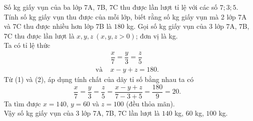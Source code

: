 	\begin{ex}%
		Số kg giấy vụn của ba lớp 7A, 7B, 7C thu được lần lượt tỉ lệ với các số $7; 3; 5$. Tính số kg giấy vụn thu được của mỗi lớp, biết rằng số kg giấy vụn mà 2 lớp 7A và 7C thu được nhiều hơn lớp 7B là $180$ kg.
		\loigiai
		{
			Gọi số kg giấy vụn của 3 lớp 7A, 7B, 7C thu được lần lượt là  $x, y, z~(x, y, z >0)$; đơn vị là kg.\\
			Ta có tỉ lệ thức
			\begin{align}
				&\dfrac{x}{7}=\dfrac{y}{3}=\dfrac{z}{5} \tag{1}\\
				\text{và } & x-y+z=180. \tag{2}
			\end{align}
			Từ (1) và (2), áp dụng tính chất của dãy tỉ số bằng nhau ta có
			\[\dfrac{x}{7}=\dfrac{y}{3}=\dfrac{z}{5}=\dfrac{x-y+z}{7-3+5}=\dfrac{180}{9}=20.\]
			Ta tìm được $x = 140$, $y = 60$ và $z = 100$ (đều thỏa mãn).\\
			Vậy số kg giấy vụn của 3 lớp 7A, 7B, 7C lần lượt là $140$ kg, $60$ kg, $100$ kg.
		}
	\end{ex}

